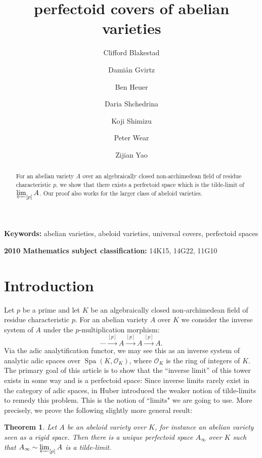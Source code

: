 \documentclass[10pt,oneside]{amsart}
\title[perfectoid covers of abelian varieties]{perfectoid  covers of abelian varieties}
\author{
	Clifford Blakestad \and
	Dami\'an Gvirtz \and
	Ben Heuer \and 
	Daria Shchedrina \and
	Koji Shimizu \and 
	Peter Wear \and
	Zijian Yao}
\newtheorem{mainthm}{Theorem}
\theoremstyle{definition}
\begin{document}
	
	\maketitle
	
	\begin{abstract}
For an abelian variety $A$ over an algebraically closed non-archimedean field of residue characteristic $p$, we show that there exists a perfectoid space which is the tilde-limit of $\varprojlim_{[p]}A$. Our proof also works for the larger class of abeloid varieties.
	\end{abstract}
	\smallskip
	\noindent \textbf{Keywords:} abelian varieties, abeloid varieties, universal covers, perfectoid spaces
	
	\smallskip
	\noindent \textbf{2010 Mathematics subject classification:} 14K15, 14G22, 11G10

	

	
	\section{Introduction} 

Let $p$ be a prime and let $K$ be an algebraically closed non-archimedean field of residue characteristic $p$.
For an abelian variety $A$ over $K$ we consider the inverse system of $A$ under the $p$-multiplication morphism:
\[\cdots\xrightarrow{[p]}A\xrightarrow{[p]}A\xrightarrow{[p]}A.\]
Via the adic analytification functor, we may see this as an inverse system of analytic adic spaces over $\operatorname{Spa}(K,\mathcal O_K)$, where $\mathcal O_K$ is the ring of integers of $K$.
The primary goal of this article is to show that the ``inverse limit'' of this tower exists in some way and is a perfectoid space: Since inverse limits rarely exist in the category of adic spaces, in \cite{huber2013etale} Huber introduced the weaker notion of tilde-limits to remedy this problem. This is the notion of ``limits" we are going to use. More precisely, we prove the following slightly more general result:

 


\begin{mainthm} \label{thm:main_thm_intro}
	Let $A$ be an abeloid variety over $K$, for instance an abelian variety seen as a rigid space. Then there is a unique perfectoid space $A_\infty$ over $K$ such that
	$A_\infty \sim \varprojlim_{[p]} A$ is a tilde-limit.
\end{mainthm}
\end{document}
